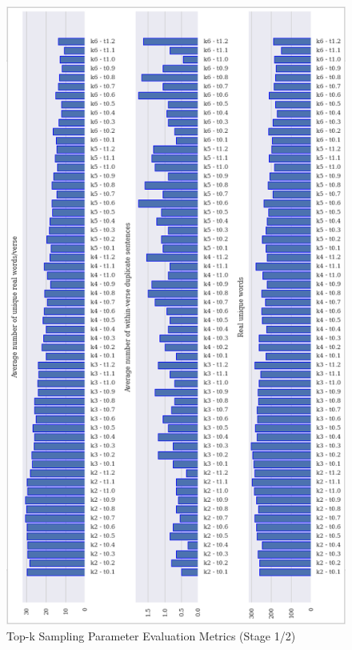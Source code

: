 \begin{figure}[h]
    \centering
    \includegraphics[scale=0.85, keepaspectratio=true]{figures/top-k_param_eval_s1.png}
    \caption{Top-k Sampling Parameter Evaluation Metrics (Stage 1/2)}
    \label{fig:top-k-param-eval-1}
\end{figure}

